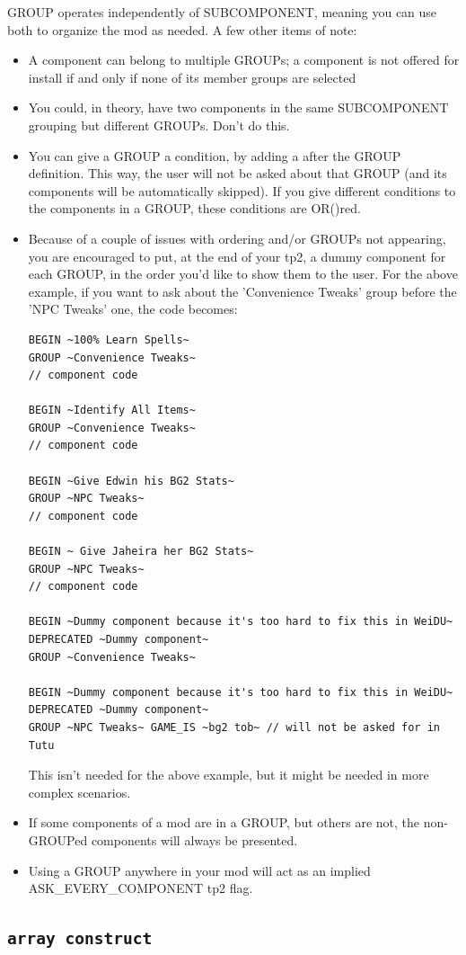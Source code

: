 \documentclass{article}
\def\ttref#1{\ahrefloc{#1}{\tt #1}}
\def\t#1{{\tt #1}}
\begin{document}
GROUP operates independently of SUBCOMPONENT, meaning you can use both to
organize the mod as needed. A few other items of note:
\begin{itemize}
\item A component can belong to multiple GROUPs; a component is not offered
for install if and only if none of its member groups are selected
\item You could, in theory, have two components in the same SUBCOMPONENT
grouping but different GROUPs. Don't do this.
\item You can give a GROUP a condition, by adding a \ttref{value} after the
GROUP definition. This way, the user will not be asked about that GROUP (and
its components will be automatically skipped). If you give different conditions
to the components in a GROUP, these conditions are OR()red.
\item Because of a couple of issues with ordering and/or GROUPs not appearing,
you are encouraged to put, at the end of your tp2, a dummy component for each
GROUP, in the order you'd like to show them to the user. For the above example,
if you want to ask about the 'Convenience Tweaks' group before the 'NPC Tweaks'
one, the code becomes:
\begin{verbatim}
BEGIN ~100% Learn Spells~
GROUP ~Convenience Tweaks~
// component code

BEGIN ~Identify All Items~
GROUP ~Convenience Tweaks~
// component code

BEGIN ~Give Edwin his BG2 Stats~
GROUP ~NPC Tweaks~
// component code

BEGIN ~ Give Jaheira her BG2 Stats~
GROUP ~NPC Tweaks~
// component code

BEGIN ~Dummy component because it's too hard to fix this in WeiDU~
DEPRECATED ~Dummy component~
GROUP ~Convenience Tweaks~

BEGIN ~Dummy component because it's too hard to fix this in WeiDU~
DEPRECATED ~Dummy component~
GROUP ~NPC Tweaks~ GAME_IS ~bg2 tob~ // will not be asked for in Tutu
\end{verbatim}
This isn't needed for the above example, but it might be needed in more complex
scenarios.
\item If some components of a mod are in a GROUP, but others are not, the
non-GROUPed components will always be presented.
\item Using a GROUP anywhere in your mod will act as an implied
ASK_EVERY_COMPONENT tp2 flag.
\end{itemize}
\label{sec-array-construct}\subsection{\t{array construct}}
\end{document}
